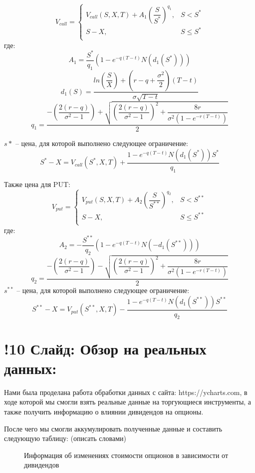 \documentclass[a4paper]{article}
\begin{document}
\begin{equation*}
    V_{call} = 
    \begin{cases}
        V_{call}(S, X, T) + A_1 \left(\dfrac{S}{S^*} \right)^{q_1}, &S < S^*\\
        S-X, &S \leq S^* \\
    \end{cases}
\end{equation*}
где:
\[A_1 = \dfrac{S^*}{q_1} \left( 1 - e^{-q(T - t)} N(d_1(S^*)) \right)\]
\[d_1(S) = \dfrac{ln \left( \dfrac{S}{X} \right) + (r - q + \dfrac{\sigma^2}{2}) (T-t)}{\sigma \sqrt{T - t}}\]
\[q_1 = \dfrac{ - \left(\dfrac{2 (r - q)}{\sigma^2 - 1 }\right) + \sqrt{ \left(\dfrac{2 (r - q)}{\sigma^2 - 1 }\right)^2 + \dfrac{8r}{\sigma^2 (1 - e^{-r (T-t)})}}}{2}\]

$s*$ -- цена, для которой выполнено следующее ограничение:
\[S^* - X = V_{call}(S^*, X, T) + \dfrac{1 - e^{-q(T - t)} N(d_1(S^*)) S^*}{q_1}\]

Также цена для PUT:
\begin{equation*}
    V_{put} = 
    \begin{cases}
        V_{put}(S, X, T) + A_2 \left(\dfrac{S}{S^{**}} \right)^{q_2}, &S < S^{**}\\
        S-X, &S \leq S^{**} \\
    \end{cases}
\end{equation*}
где:
\[A_2 = -\dfrac{S^{**}}{q_2} \left( 1 - e^{-q(T - t)} N(-d_1(S^{**})) \right)\]
\[q_2 = \dfrac{ - \left(\dfrac{2 (r - q)}{\sigma^2 - 1 }\right) - \sqrt{ \left(\dfrac{2 (r - q)}{\sigma^2 - 1 }\right)^2 + \dfrac{8r}{\sigma^2 (1 - e^{-r (T-t)})}}}{2}\]
$s^{**}$ -- цена, для которой выполнено следующее ограничение:
\[S^{**} - X = V_{put}(S^{**}, X, T) - \dfrac{1 - e^{-q(T - t)} N(d_1(S^{**})) S^{**}}{q_2}\]
\section*{!10 Слайд: Обзор на реальных данных:}
Нами была проделана работа обработки данных с сайта: https://ycharts.com, в ходе которой мы смогли взять реальные данные на торгующиеся инструменты, а также получить информацию о влиянии дивидендов на опционы.

После чего мы смогли аккумулировать полученные данные и составить следующую таблицу: (описать словами)
\begin{figure}[h]
    \caption{Информация об изменениях стоимости опционов в зависимости от дивидендов}
    \label{fig:image}
\end{figure}
\end{document}
